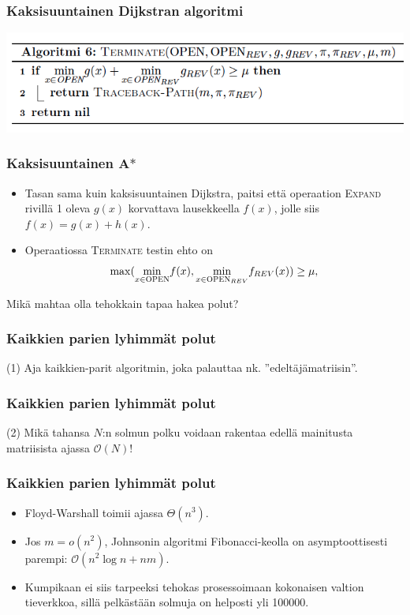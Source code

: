 \documentclass{beamer}
\begin{document}
\begin{frame}
  \frametitle{Kaksisuuntainen Dijkstran algoritmi}
  \includegraphics[width=\textwidth,height=0.85\textheight,keepaspectratio]{term}
\end{frame}

\begin{frame}
  \frametitle{Kaksisuuntainen A$\ast$}
  \begin{itemize}
    \item Tasan sama kuin kaksisuuntainen Dijkstra, paitsi että operaation \textsc{Expand} rivillä 1 oleva $g(x)$ korvattava lausekkeella $f(x)$, jolle siis $f(x) = g(x) + h(x)$.
    \item Operaatiossa \textsc{Terminate} testin ehto on
    \[
    \max( \underset{x \in \textsc{OPEN}}{\min} f(x), \underset{x \in \textsc{OPEN}_{REV}}{\min}f_{REV}(x) ) \geq \mu,    
    \]
  \end{itemize}
\end{frame}

\begin{frame}
  Mikä mahtaa olla tehokkain tapaa hakea polut?
\end{frame}

\begin{frame}
  \frametitle{Kaikkien parien lyhimmät polut}
  (1) Aja kaikkien-parit algoritmin, joka palauttaa nk. ''edeltäjämatriisin''.
\end{frame}

\begin{frame}
  \frametitle{Kaikkien parien lyhimmät polut}
  (2) Mikä tahansa $N$:n solmun polku voidaan rakentaa edellä mainitusta matriisista ajassa $\mathcal{O}(N)$!
\end{frame}

\begin{frame}
  \frametitle{Kaikkien parien lyhimmät polut}
  \begin{itemize}
    \item Floyd-Warshall toimii ajassa $\Theta(n^3)$.
    \item Jos $m = o(n^2)$, Johnsonin algoritmi Fibonacci-keolla on asymptoottisesti parempi: $\mathcal{O}(n^2 \log n + nm)$.
    \item Kumpikaan ei siis tarpeeksi tehokas prosessoimaan kokonaisen valtion tieverkkoa, sillä pelkästään solmuja on helposti yli 100000.
  \end{itemize}
\end{frame}
\end{document}
